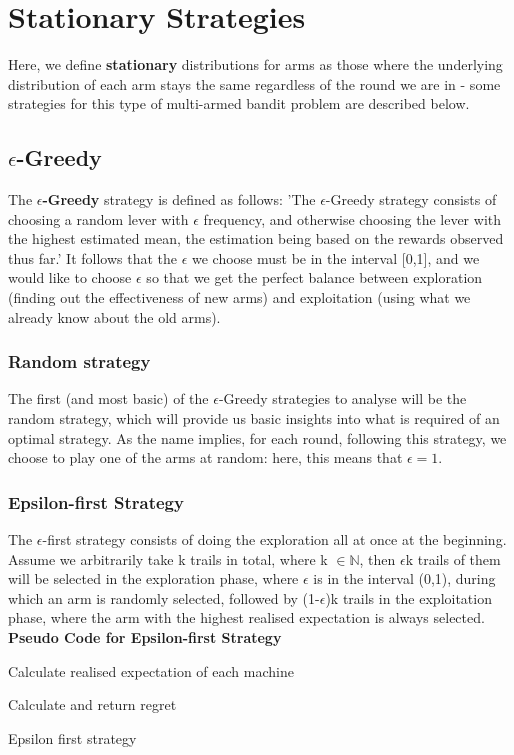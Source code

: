 \section{Stationary Strategies}
Here, we define \textbf{stationary} distributions for arms as those where the underlying distribution of each arm stays the same regardless of the round we are in - some strategies for this type of multi-armed bandit problem are described below.

\subsection{$\epsilon$-Greedy}
The \textbf{$\epsilon$-Greedy} strategy is defined as follows: 'The $\epsilon$-Greedy strategy consists of choosing a random lever with $\epsilon$ frequency, and otherwise choosing the lever with the highest estimated mean, the estimation being based on the rewards observed thus far.' \citep{vermorel} It follows that the $\epsilon$ we choose must be in the interval [0,1], and we would like to choose $\epsilon$ so that we get the perfect balance between exploration (finding out the effectiveness of new arms) and exploitation (using what we already know about the old arms).

\subsubsection{Random strategy}
The first (and most basic) of the $\epsilon$-Greedy strategies to analyse will be the random strategy, which will provide us basic insights into what is required of an optimal strategy. As the name implies, for each round, following this strategy, we choose to play one of the arms at random: here, this means that $\epsilon = 1$.

\subsubsection{Epsilon-first Strategy}

The $\epsilon$-first strategy consists of doing the exploration all at once at the beginning\citep{vermorel}. Assume we arbitrarily take k trails in total, where k $\in \mathbb{N}$, then $\epsilon$k trails of them will be selected in the exploration phase, where $\epsilon$ is in the interval (0,1), during which an arm is randomly selected, followed by (1-$\epsilon$)k trails in the exploitation phase, where the arm with the highest realised expectation is always selected.
\newline
\textbf{Pseudo Code for Epsilon-first Strategy}
\newline
\begin{algorithm}[H]
    Calculate realised expectation of each machine\;

    Calculate and return regret
    \caption{Epsilon first strategy}
\end{algorithm}

